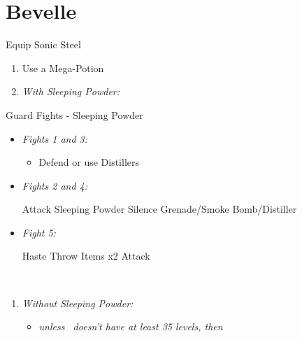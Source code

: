 \chapter{Bevelle}
\begin{equip}
	\begin{itemize}

		\tidusf Equip Sonic Steel
	\end{itemize}
\end{equip}
\begin{enumerate}
	\item Use a Mega-Potion
	\item \textit{With Sleeping Powder:}
\end{enumerate}
\begin{battle}{Guard Fights - Sleeping Powder}
	\begin{itemize}
		\item \textit{Fights 1 and 3:}
		      \begin{itemize}
			      \tidusf Attack
			      \item Defend or use Distillers
		      \end{itemize}
		\item \textit{Fights 2 and 4:}
		      \begin{itemize}
			      \tidusf Attack
			      \rikkuf Sleeping Powder
			      \kimahrif Silence Grenade/Smoke Bomb/Distiller
		      \end{itemize}
		\item \textit{Fight 5:}
		      \begin{itemize}
			      \tidusf Haste \rikku
			      \rikkuf Throw Items x2
			      \tidusf Attack
		      \end{itemize}
	\end{itemize}
\end{battle}
\vfill
\
\columnbreak
\begin{enumerate}[resume]
	\item \textit{Without Sleeping Powder:}
	      \begin{itemize}
		      \item \formation{\tidus}{\rikku}{\auron} \textit{unless \lulu\ doesn't have at least 35 levels, then } \formation{\tidus}{\rikku}{\lulu}
	      \end{itemize}
\end{enumerate}
